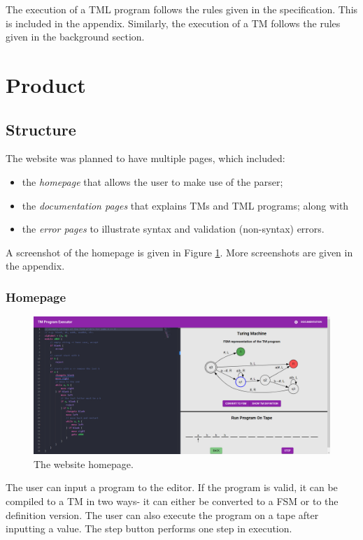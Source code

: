 The execution of a TML program follows the rules given in the specification. This is included in the appendix. Similarly, the execution of a TM follows the rules given in the background section.

\section{Product}
\subsection{Structure}
The website was planned to have multiple pages, which included:
\begin{itemize}
    \item the \emph{homepage} that allows the user to make use of the parser;
    \item the \emph{documentation pages} that explains TMs and TML programs; along with
    \item the \emph{error pages} to illustrate syntax and validation (non-syntax) errors.
\end{itemize}

A screenshot of the homepage is given in Figure \ref{fig:homepage_design}. More screenshots are given in the appendix.

\subsubsection{Homepage}
\begin{figure}[htb]
    \centering
    \includegraphics[scale=0.18]{images/Homepage execution start.png}
    \caption{The website homepage.}
    \label{fig:homepage_design}
\end{figure}

The user can input a program to the editor. If the program is valid, it can be compiled to a TM in two ways- it can either be converted to a FSM or to the definition version. The user can also execute the program on a tape after inputting a value. The step button performs one step in execution. 

